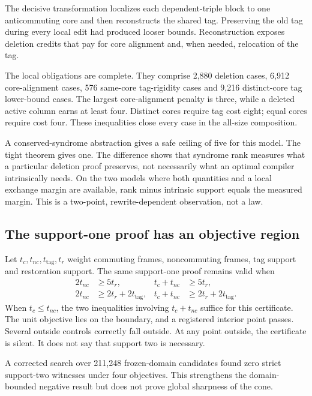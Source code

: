 The decisive transformation localizes each dependent-triple block to one anticommuting core and then reconstructs the shared tag.  Preserving the old tag during every local edit had produced looser bounds.  Reconstruction exposes deletion credits that pay for core alignment and, when needed, relocation of the tag.

The local obligations are complete.  They comprise 2,880 deletion cases, 6,912 core-alignment cases, 576 same-core tag-rigidity cases and 9,216 distinct-core tag lower-bound cases.  The largest core-alignment penalty is three, while a deleted active column earns at least four.  Distinct cores require tag cost eight; equal cores require cost four.  These inequalities close every case in the all-size composition.

A conserved-syndrome abstraction gives a safe ceiling of five for this model.  The tight theorem gives one.  The difference shows that syndrome rank measures what a particular deletion proof preserves, not necessarily what an optimal compiler intrinsically needs.  On the two models where both quantities and a local exchange margin are available, rank minus intrinsic support equals the measured margin.  This is a two-point, rewrite-dependent observation, not a law.

\subsection{The support-one proof has an objective region}

Let $t_c,t_{nc},t_{\mathrm{tag}},t_r$ weight commuting frames, noncommuting frames, tag support and restoration support.  The same support-one proof remains valid when
\begin{align}
2t_{nc} &\geq 5t_r, & t_c+t_{nc} &\geq 5t_r,\\
2t_{nc} &\geq 2t_r+2t_{\mathrm{tag}}, &
t_c+t_{nc} &\geq 2t_r+2t_{\mathrm{tag}}.
\end{align}
When $t_c\leq t_{nc}$, the two inequalities involving $t_c+t_{nc}$ suffice for this certificate.  The unit objective lies on the boundary, and a registered interior point passes.  Several outside controls correctly fall outside.  At any point outside, the certificate is silent.  It does not say that support two is necessary.

A corrected search over 211,248 frozen-domain candidates found zero strict support-two witnesses under four objectives.  This strengthens the domain-bounded negative result but does not prove global sharpness of the cone.

